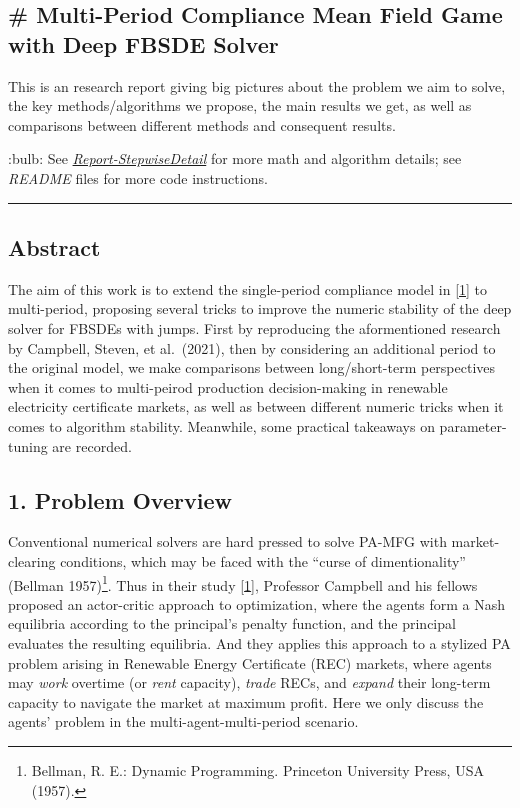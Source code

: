 \documentclass[
]{article}
\author{}
\date{}
\begin{document}
\hypertarget{multi-period-compliance-mean-field-game-with-deep-fbsde-solver}{%
\subsection{\# Multi-Period Compliance Mean Field Game with Deep FBSDE
Solver}\label{multi-period-compliance-mean-field-game-with-deep-fbsde-solver}}

This is an research report giving big pictures about the problem we aim
to solve, the key methods/algorithms we propose, the main results we
get, as well as comparisons between different methods and consequent
results.

:bulb: See
\href{../FinalReports/Report-StepwiseDetail.md}{\emph{Report-StepwiseDetail}}
for more math and algorithm details; see \emph{README} files for more
code instructions.

\begin{center}\rule{0.5\linewidth}{0.5pt}\end{center}

\hypertarget{abstract}{%
\subsection{Abstract}\label{abstract}}

The aim of this work is to extend the single-period compliance model in
\href{\%22https://doi.org/10.48550/arXiv.2110.01127\%22}{{[}1{]}} to
multi-period, proposing several tricks to improve the numeric stability
of the deep solver for FBSDEs with jumps. First by reproducing the
aformentioned research by Campbell, Steven, et al.~(2021), then by
considering an additional period to the original model, we make
comparisons between long/short-term perspectives when it comes to
multi-peirod production decision-making in renewable electricity
certificate markets, as well as between different numeric tricks when it
comes to algorithm stability. Meanwhile, some practical takeaways on
parameter-tuning are recorded.

\hypertarget{problem-overview}{%
\subsection{1. Problem Overview}\label{problem-overview}}

Conventional numerical solvers are hard pressed to solve PA-MFG with
market-clearing conditions, which may be faced with the ``curse of
dimentionality'' (Bellman 1957)\footnote{Bellman, R. E.: Dynamic
  Programming. Princeton University Press, USA (1957).}. Thus in their
study \href{\%22https://doi.org/10.48550/arXiv.2110.01127\%22}{{[}1{]}},
Professor Campbell and his fellows proposed an actor-critic approach to
optimization, where the agents form a Nash equilibria according to the
principal's penalty function, and the principal evaluates the resulting
equilibria. And they applies this approach to a stylized PA problem
arising in Renewable Energy Certificate (REC) markets, where agents may
\emph{work} overtime (or \emph{rent} capacity), \emph{trade} RECs, and
\emph{expand} their long-term capacity to navigate the market at maximum
profit. Here we only discuss the agents' problem in the
multi-agent-multi-period scenario.
\end{document}
